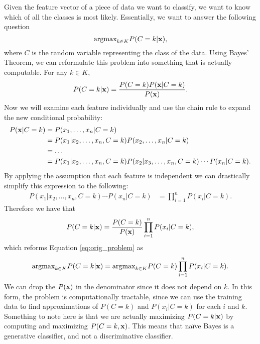 Given the feature vector of a piece of data we want to classify, we want to know which of all the classes is most likely. Essentially, we want to answer the following question
\begin{equation}\label{eq:orig_problem}
    \mbox{argmax}_{k\in K} P(C=k | \mathbf{x}),
\end{equation}
where $C$ is the random variable representing the class of the data.
Using Bayes' Theorem, we can reformulate this problem into something that is actually computable. For any $k\in K$,
\begin{align*}
    P(C=k | \mathbf{x}) = \frac{P(C=k)P(\mathbf{x} | C=k)}{P(\mathbf{x})}.
\end{align*}
Now we will examine each feature individually and use the chain rule to expand the new conditional probability:
\begin{align*}
    P(\mathbf{x} | C=k) &= P(x_1,\dots,x_n|C=k) \\
    &= P(x_1 | x_2,\dots,x_n,C=k)P(x_2,\dots,x_n|C=k) \\
    &= \dots \\
    &= P(x_1 | x_2,\dots,x_n,C=k)P(x_2 | x_3, \dots, x_n,C=k)\cdots P(x_n | C=k).
\end{align*}
By applying the assumption that each feature is independent we can drastically simplify this expression to the following:
\begin{align*}
    P(x_1 | x_2,\dots,x_n,C=k)\cdots P(x_n | C=k) &= \prod_{i=1}^{n}P(x_i | C=k).
\end{align*}
Therefore we have that 
\begin{align*}
    P(C=k | \mathbf{x}) = \frac{P(C=k)}{P(\mathbf{x})} \prod_{i=1}^{n}P(x_i | C=k),
\end{align*}
which reforms Equation \ref{eq:orig_problem} as
\begin{equation}\label{eq:simple_problem}
    \mbox{argmax}_{k\in K} P(C=k | \mathbf{x}) = \mbox{argmax}_{k\in K} P(C=k)\prod_{i=1}^{n}P(x_i | C=k).
\end{equation}
We can drop the $P(\mathbf{x})$ in the denominator since it does not depend on $k$.
In this form, the problem is computationally tractable,
since we can use the training data to find approximations of $P(C=k)$ and $P(x_i|C=k)$ for each $i$ and $k$.
Something to note here is that we are actually maximizing $P(C=k | \mathbf{x})$ by computing and maximizing $P(C=k,\mathbf{x})$.
This means that naïve Bayes is a generative classifier, and not a discriminative classifier.

